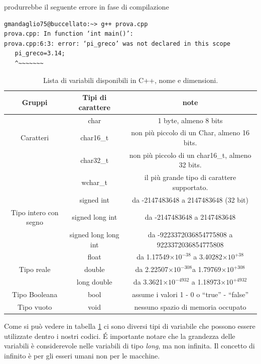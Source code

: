 \documentclass[11pt,fleqn]{book} %
\begin{document}
produrrebbe il seguente errore in fase di compilazione 



\begin{verbatim}
gmandaglio75@buccellato:~> g++ prova.cpp
prova.cpp: In function ‘int main()’:
prova.cpp:6:3: error: ‘pi_greco’ was not declared in this scope
   pi_greco=3.14;
   ^~~~~~~~
\end{verbatim}



\begin{table}[h]
\footnotesize
\begin{tabular}{c|c|c}
Gruppi & Tipi di carattere & note\\
\hline
          & char	    & 1 byte, almeno 8 bits\\
Caratteri & char16\_t	&   non più piccolo di un Char, almeno 16 bits.\\
          & char32\_t	& non più piccolo di un char16\_t, almeno 32 bits.\\
          & wchar\_t	    & il più grande tipo di carattere supportato.\\
          \hline
          

 & signed int	          & da  -2147483648 a   2147483648 (32 bit)\\
Tipo intero con segno & signed long int	      & da  -2147483648 a   2147483648\\
 & signed long long int  & da -9223372036854775808 a 9223372036854775808\\
\hline
	& float	& da 1.17549$\times 10^{-38}$ a 3.40282$\times 10^{+38}$\\
Tipo reale  &  double &	 da 2.22507$\times 10^{-308}$a 1.79769$\times 10^{+308}$\\
   & long double &	da  3.3621$\times 10^{-4932}$ a 1.18973$\times 10^{+4932}$\\
\hline
Tipo Booleana &	bool &	assume i valori 1 - 0 o ``true'' - ``false''\\
\hline
Tipo vuoto &	void &	nessuno spazio di memoria occupato
\end{tabular}
\caption{ Lista di variabili disponibili in C++, nome e dimensioni. \label{tab1}}
\end{table}

Come si può vedere in tabella \ref{tab1} ci sono diversi tipi di variabile che possono essere utilizzate dentro i nostri codici. \'E importante notare che la grandezza delle variabili è considerevole nelle variabili di tipo \textit{long}, ma non infinita. Il concetto di infinito è per gli esseri umani non per le macchine. 
\end{document}

